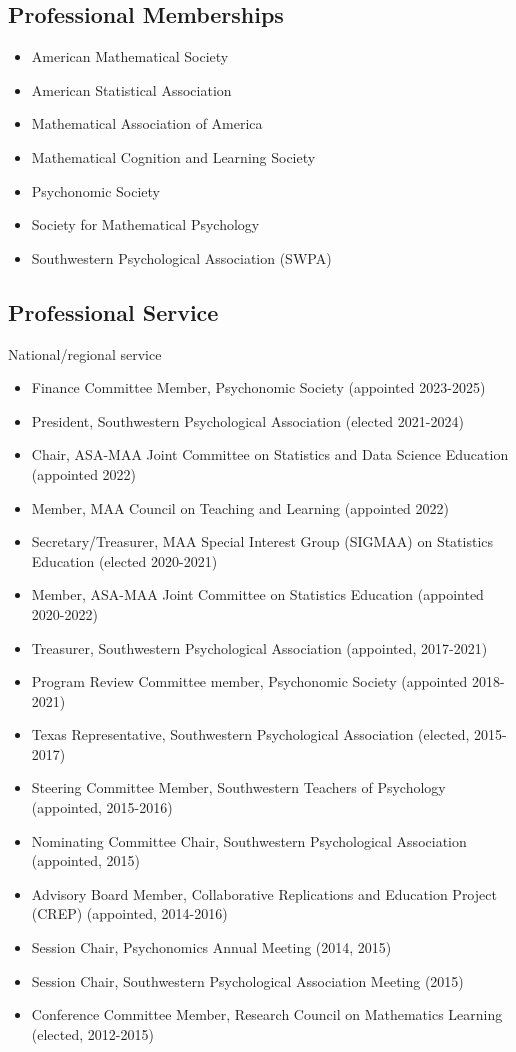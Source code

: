 \documentclass[article,10pt]{article}
\begin{document}
\subsection*{Professional Memberships}
\label{sec:org41ea10e}
\begin{itemize}
\item American Mathematical Society
\item American Statistical Association
\item Mathematical Association of America
\item Mathematical Cognition and Learning Society
\item Psychonomic Society
\item Society for Mathematical Psychology
\item Southwestern Psychological Association (SWPA)
\end{itemize}

\subsection*{Professional Service}
\label{sec:org6951752}

National/regional service 

\begin{itemize}
\item Finance Committee Member, Psychonomic Society (appointed 2023-2025)
\item President, Southwestern Psychological Association (elected 2021-2024)
\item Chair, ASA-MAA Joint Committee on Statistics and Data Science Education (appointed 2022)
\item Member, MAA Council on Teaching and Learning (appointed 2022)
\item Secretary/Treasurer, MAA Special Interest Group (SIGMAA) on Statistics Education (elected 2020-2021)
\item Member, ASA-MAA Joint Committee on Statistics Education (appointed 2020-2022)
\item Treasurer, Southwestern Psychological Association (appointed, 2017-2021)
\item Program Review Committee member, Psychonomic Society (appointed 2018-2021)
\item Texas Representative, Southwestern Psychological Association (elected, 2015-2017)
\item Steering Committee Member, Southwestern Teachers of Psychology (appointed, 2015-2016)
\item Nominating Committee Chair, Southwestern Psychological Association (appointed, 2015)
\item Advisory Board Member, Collaborative Replications and Education Project (CREP) (appointed, 2014-2016)
\item Session Chair, Psychonomics Annual Meeting (2014, 2015)
\item Session Chair, Southwestern Psychological Association Meeting (2015)
\item Conference Committee Member, Research Council on Mathematics Learning (elected, 2012-2015)
\end{itemize}
\end{document}
